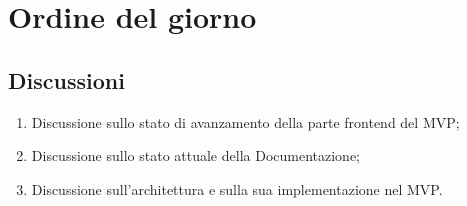 \section{Ordine del giorno} \label{sec:agenda}
\subsection{Discussioni} \label{subsec:discussione}
\begin{enumerate}
    \item Discussione sullo stato di avanzamento della parte frontend del MVP;
    \item Discussione sullo stato attuale della Documentazione;
    \item Discussione sull'architettura e sulla sua implementazione nel MVP.
\end{enumerate}

